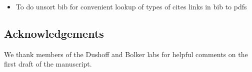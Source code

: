 \begin{itemize}
  \item To do
  	\subitem unsort bib for convenient lookup of types of cites
    \subitem links in bib to pdfs
\end{itemize}

\subsection*{Acknowledgements}

We thank members of the Dushoff and Bolker labs for helpful comments on the first draft of the manuscript.  

